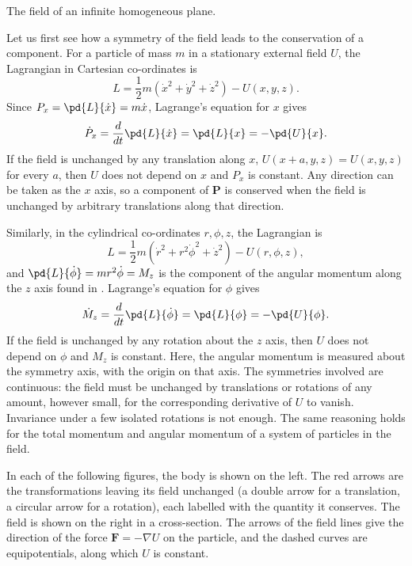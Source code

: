 \begin{subproblem}
{
The field of an infinite homogeneous plane.
}
{
Let us first see how a symmetry of the field leads to the conservation of a component. For a particle of mass $m$ in a stationary external field $U$, the Lagrangian in Cartesian co-ordinates is
\begin{equation*}
    L = \frac{1}{2} m (\Dot{x}^2 + \Dot{y}^2 + \Dot{z}^2) - U(x,y,z).
\end{equation*}
Since $P_x = \pd{L}{\Dot{x}} = m\Dot{x}$, Lagrange's equation for $x$ gives
\begin{equation*}
    \Dot{P}_x = \frac{d}{dt} \pd{L}{\Dot{x}} = \pd{L}{x} = -\pd{U}{x} .
\end{equation*}
If the field is unchanged by any translation along $x$, \ie $U(x+a,y,z) = U(x,y,z)$ for every $a$, then $U$ does not depend on $x$ and $P_x$ is constant. Any direction can be taken as the $x$ axis, so a component of $\mathbf{P}$ is conserved when the field is unchanged by arbitrary translations along that direction.

Similarly, in the cylindrical co-ordinates $r,\phi,z$, the Lagrangian is
\begin{equation*}
    L = \frac{1}{2} m (\Dot{r}^2 + r^2\Dot{\phi}^2 + \Dot{z}^2) - U(r,\phi,z),
\end{equation*}
and $\pd{L}{\Dot{\phi}} = mr^2\Dot{\phi} = M_z$ is the component of the angular momentum along the $z$ axis found in . Lagrange's equation for $\phi$ gives
\begin{equation*}
    \Dot{M}_z = \frac{d}{dt} \pd{L}{\Dot{\phi}} = \pd{L}{\phi} = -\pd{U}{\phi} .
\end{equation*}
If the field is unchanged by any rotation about the $z$ axis, then $U$ does not depend on $\phi$ and $M_z$ is constant. Here, the angular momentum is measured about the symmetry axis, \ie with the origin on that axis. The symmetries involved are continuous: the field must be unchanged by translations or rotations of any amount, however small, for the corresponding derivative of $U$ to vanish. Invariance under a few isolated rotations is not enough. The same reasoning holds for the total momentum and angular momentum of a system of particles in the field.

In each of the following figures, the body is shown on the left. The red arrows are the transformations leaving its field unchanged (a double arrow for a translation, a circular arrow for a rotation), each labelled with the quantity it conserves. The field is shown on the right in a cross-section. The arrows of the field lines give the direction of the force $\mathbf{F} = -\nabla U$ on the particle, and the dashed curves are equipotentials, along which $U$ is constant.

}
\end{subproblem}
